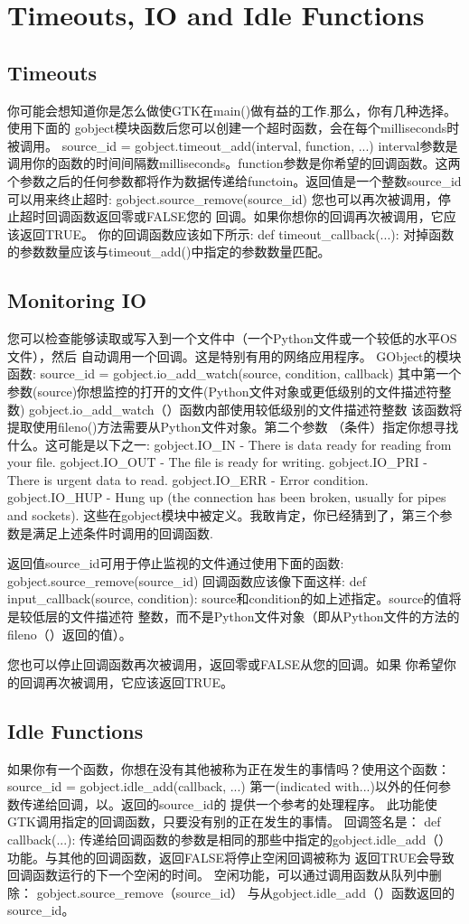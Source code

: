 \chapter{Timeouts, IO and Idle Functions}
\section{Timeouts}
你可能会想知道你是怎么做使GTK在main()做有益的工作.那么，你有几种选择。使用下面的
gobject模块函数后您可以创建一个超时函数，会在每个milliseconds时被调用。
source_id = gobject.timeout_add(interval, function, ...)
interval参数是调用你的函数的时间间隔数milliseconds。function参数是你希望的回调函数。这两个参数之后的任何参数都将作为数据传递给functoin。返回值是一个整数source_id可以用来终止超时:
gobject.source_remove(source_id)
您也可以再次被调用，停止超时回调函数返回零或FALSE您的
回调。如果你想你的回调再次被调用，它应该返回TRUE。
你的回调函数应该如下所示:
def timeout_callback(...):
对掉函数的参数数量应该与timeout_add()中指定的参数数量匹配。
\section{Monitoring IO}
您可以检查能够读取或写入到一个文件中（一个Python文件或一个较低的水平OS文件），然后
自动调用一个回调。这是特别有用的网络应用程序。 GObject的模块函数:
source_id = gobject.io_add_watch(source, condition, callback)
其中第一个参数(source)你想监控的打开的文件(Python文件对象或更低级别的文件描述符整数)
gobject.io_add_watch（）函数内部使用较低级别的文件描述符整数
该函数将提取使用fileno()方法需要从Python文件对象。第二个参数
（条件）指定你想寻找什么。这可能是以下之一:
gobject.IO_IN - There is data ready for reading from your file.
gobject.IO_OUT - The file is ready for writing.
gobject.IO_PRI - There is urgent data to read.
gobject.IO_ERR - Error condition.
gobject.IO_HUP - Hung up (the connection has been broken, usually for
pipes and sockets).
这些在gobject模块中被定义。我敢肯定，你已经猜到了，第三个参数是满足上述条件时调用的回调函数.

返回值source_id可用于停止监视的文件通过使用下面的函数:
gobject.source_remove(source_id)
回调函数应该像下面这样:
def input_callback(source, condition):
source和condition的如上述指定。source的值将是较低层的文件描述符
整数，而不是Python文件对象（即从Python文件的方法的fileno（）返回的值）。

您也可以停止回调函数再次被调用，返回零或FALSE从您的回调。如果
你希望你的回调再次被调用，它应该返回TRUE。
\section{Idle Functions}
如果你有一个函数，你想在没有其他被称为正在发生的事情吗？使用这个函数：
source_id = gobject.idle_add(callback, ...)
第一(indicated with...)以外的任何参数传递给回调，以。返回的source_id的
提供一个参考的处理程序。
此功能使GTK调用指定的回调函数，只要没有别的正​​在发生的事情。
回调签名是：
def callback(...):
传递给回调函数的参数是相同的那些中指定的gobject.idle_add（）
功能。与其他的回调函数，返回FALSE将停止空闲回调被称为
返回TRUE会导致回调函数运行的下一个空闲的时间。	
空闲功能，可以通过调用函数从队列中删除：
gobject.source_remove（source_id）
与从gobject.idle_add（）函数返回的source_id。
